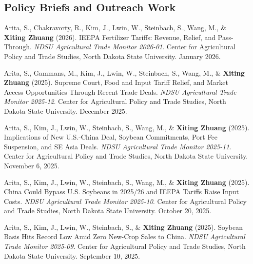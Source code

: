 \documentclass[10.5pt,letterpaper]{article}
\renewenvironment{itemize}{
	\begin{list}{}{
			\setlength{\leftmargin}{1.5em}
		}
	}{
	\end{list}
}
\begin{document}
	
	
	
	
	
	\subsection*{\textbf{Policy Briefs and Outreach Work}}
	\begin{itemize}
		
		\item[-] Arita, S., Chakravorty, R., Kim, J., Lwin, W., Steinbach, S., Wang, M., \& \textbf{Xiting Zhuang} (2026).  
		IEEPA Fertilizer Tariffs: Revenue, Relief, and Pass-Through.  
		\textit{NDSU Agricultural Trade Monitor 2026-01}. Center for Agricultural Policy and Trade Studies, North Dakota State University. January 2026.
		
		\item[-] Arita, S., Gammans, M., Kim, J., Lwin, W., Steinbach, S., Wang, M., \& \textbf{Xiting Zhuang} (2025).  
		Supreme Court, Food and Input Tariff Relief, and Market Access Opportunities Through Recent Trade Deals.  
		\textit{NDSU Agricultural Trade Monitor 2025-12}. Center for Agricultural Policy and Trade Studies, North Dakota State University. December 2025.
		
		
			\item[-] Arita, S., Kim, J., Lwin, W., Steinbach, S., Wang, M., \& \textbf{Xiting Zhuang} (2025).  
		Implications of New U.S.-China Deal, Soybean Commitments, Port Fee Suspension, and SE Asia Deals.  
		\textit{NDSU Agricultural Trade Monitor 2025-11}. Center for Agricultural Policy and Trade Studies, North Dakota State University. November 6, 2025.
		
		
		
		
		\item[-] Arita, S., Kim, J., Lwin, W., Steinbach, S., Wang, M., \& \textbf{Xiting Zhuang} (2025).  
		China Could Bypass U.S. Soybeans in 2025/26 and IEEPA Tariffs Raise Input Costs.  
		\textit{NDSU Agricultural Trade Monitor 2025-10}. Center for Agricultural Policy and Trade Studies, North Dakota State University. October 20, 2025.
		
		
		
		
		\item[-] Arita, S., Kim, J., Lwin, W., Steinbach, S., \& \textbf{Xiting Zhuang} (2025).  
		Soybean Basis Hits Record Low Amid Zero New-Crop Sales to China.  
		\textit{NDSU Agricultural Trade Monitor 2025-09}. Center for Agricultural Policy and Trade Studies, North Dakota State University. September 10, 2025.  


\end{itemize}
\end{document}
